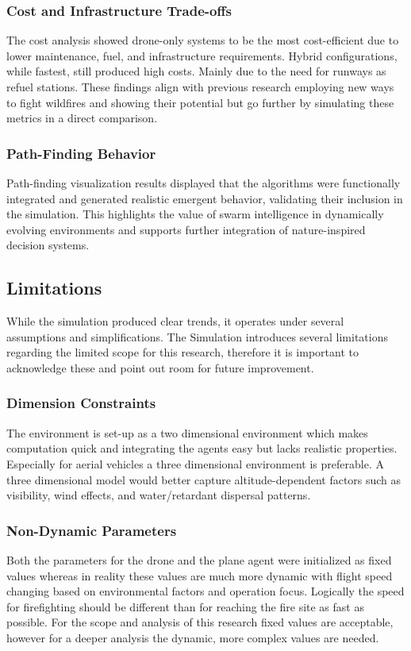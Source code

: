 \documentclass[11pt, a4paper]{article}
\begin{document}
\subsubsection{Cost and Infrastructure Trade-offs}

The cost analysis showed drone-only systems to be the most cost-efficient due to lower maintenance, fuel, and infrastructure requirements. Hybrid configurations, while fastest, still produced high costs. Mainly due to the need for runways as refuel stations. These findings align with previous  research employing new ways to fight wildfires and showing their potential \cite{fireBalls} but go further by simulating these metrics in a direct comparison. 

\subsubsection{Path-Finding Behavior}

Path-finding visualization results displayed that the algorithms were functionally integrated and generated realistic emergent behavior, validating their inclusion in the simulation. This highlights the value of swarm intelligence in dynamically evolving environments and supports further integration of nature-inspired decision systems.


\subsection{Limitations}

While the simulation produced clear trends, it operates under several assumptions and simplifications. The Simulation introduces several limitations regarding the limited scope for this research, therefore it is important to acknowledge these and point out room for future improvement. 

\subsubsection{Dimension Constraints}
The environment is set-up as a two dimensional environment which makes computation quick and integrating the agents easy but lacks realistic properties. Especially for aerial vehicles a three dimensional environment is preferable. A three dimensional model would better capture altitude-dependent factors such as visibility, wind effects, and water/retardant dispersal patterns. 

\subsubsection{Non-Dynamic Parameters} 
Both the parameters for the drone and the plane agent were initialized as fixed values whereas in reality these values are much more dynamic with flight speed changing based on environmental factors and operation focus. Logically the speed for firefighting should be different than for reaching the fire site as fast as possible. For the scope and analysis of this research fixed values are acceptable, however for a deeper analysis the dynamic, more complex values are needed.
\end{document}
